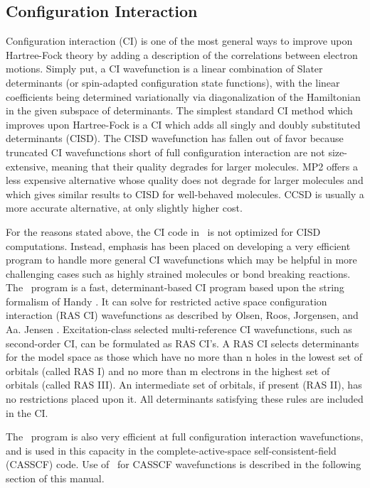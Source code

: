\subsection{Configuration Interaction} \label{detci}
                                                                                
Configuration interaction (CI) is one of the most general ways to improve
upon Hartree-Fock theory by adding a description of the correlations
between electron motions.  Simply put, a CI wavefunction is a linear
combination of Slater determinants (or spin-adapted configuration
state functions), with the linear coefficients being determined 
variationally via diagonalization of the Hamiltonian in the given
subspace of determinants.  The simplest standard CI method which improves
upon Hartree-Fock is a CI which adds all singly and doubly substituted
determinants (CISD).  The CISD wavefunction
has fallen out of favor because truncated CI wavefunctions
short of full configuration interaction
are not size-extensive, meaning that their
quality degrades for larger molecules.  MP2 offers a less expensive
alternative whose quality does not degrade for larger molecules and which 
gives similar results to CISD for well-behaved molecules.  CCSD is 
usually a more accurate alternative, at only slightly higher
cost.

For the reasons stated above, the CI code in \PSIthree\ is not optimized
for CISD computations.  Instead, emphasis has been placed on developing
a very efficient program to handle more general CI wavefunctions
which may be helpful in more challenging cases such as highly strained
molecules or bond breaking reactions.  The \PSIdetci\ program is a fast,
determinant-based CI program based upon the string formalism of Handy
\cite{Handy:1980}.  It can solve for
restricted active space configuration interaction (RAS CI) wavefunctions
as described by Olsen, Roos, Jorgensen, and Aa. Jensen \cite{Olsen:1988}.
Excitation-class selected multi-reference
CI wavefunctions, such as second-order CI, can be formulated as RAS CI's.
A RAS CI selects determinants for the model space as those which have no
more than n holes in the lowest set of orbitals (called RAS I) and no
more than m electrons in the highest set of orbitals (called RAS III).
An intermediate set of orbitals, if present (RAS II), has no restrictions
placed upon it.  All determinants satisfying these rules are included
in the CI.  


The \PSIdetci\ program is also very efficient
at full configuration interaction wavefunctions, and is used in this
capacity in the complete-active-space self-consistent-field (CASSCF)
code.  Use of \PSIdetci\ for CASSCF wavefunctions is described
in the following section of this manual.

